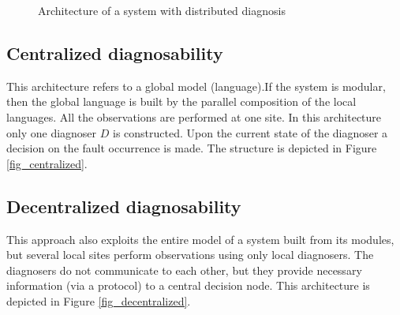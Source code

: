 \begin{figure}[t]
\centering
{}
\caption{Architecture of a system with distributed diagnosis}
\label{fig_distributed}
\end{figure}

\subsection{Centralized diagnosability}
This architecture refers to a global model (language).If the system is modular,
then the global language is built by the parallel composition of the local
languages. All the observations are performed at one site. In this architecture
only one diagnoser $D$ \cite{sampath_diagnosability_1995} is constructed. Upon
the current state of the diagnoser a decision on the fault occurrence is made.
The structure is depicted in Figure \ref{fig_centralized}.

\subsection{Decentralized diagnosability}
This approach also exploits the entire model of a system built from its modules,
but several local sites perform observations using only local diagnosers.
The diagnosers do not communicate to each other, but they provide necessary
information (via a protocol) to a central decision node. This architecture is
depicted in Figure \ref{fig_decentralized}.

